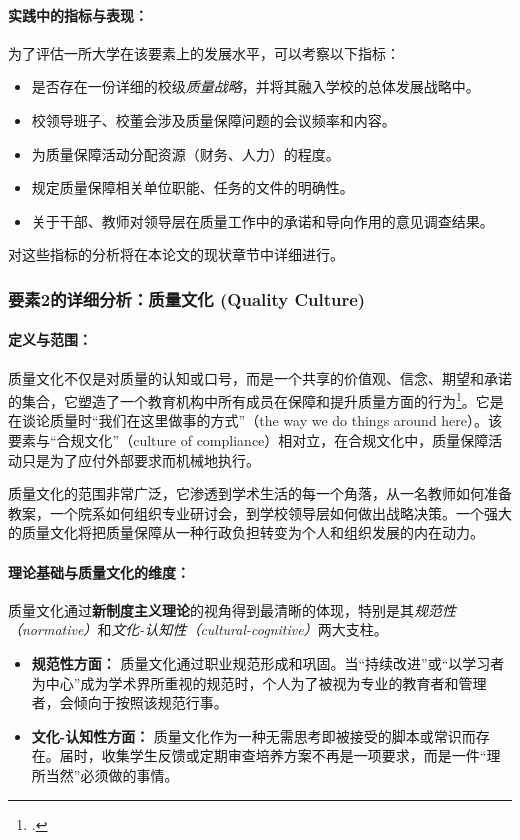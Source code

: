 \paragraph{实践中的指标与表现：}
为了评估一所大学在该要素上的发展水平，可以考察以下指标：
\begin{itemize}
    \item 是否存在一份详细的校级\textit{质量战略}，并将其融入学校的总体发展战略中。
    \item 校领导班子、校董会涉及质量保障问题的会议频率和内容。
    \item 为质量保障活动分配资源（财务、人力）的程度。
    \item 规定质量保障相关单位职能、任务的文件的明确性。
    \item 关于干部、教师对领导层在质量工作中的承诺和导向作用的意见调查结果。
\end{itemize}
对这些指标的分析将在本论文的现状章节中详细进行。




\subsubsection{要素2的详细分析：质量文化 (Quality Culture)}
\label{subsubsec:thanh_to_2}

\paragraph{定义与范围：}
质量文化不仅是对质量的认知或口号，而是一个共享的价值观、信念、期望和承诺的集合，它塑造了一个教育机构中所有成员在保障和提升质量方面的行为\footcite{HarveyStensaker}。它是在谈论质量时“我们在这里做事的方式”（the way we do things around here）。该要素与“合规文化”（culture of compliance）相对立，在合规文化中，质量保障活动只是为了应付外部要求而机械地执行。

质量文化的范围非常广泛，它渗透到学术生活的每一个角落，从一名教师如何准备教案，一个院系如何组织专业研讨会，到学校领导层如何做出战略决策。一个强大的质量文化将把质量保障从一种行政负担转变为个人和组织发展的内在动力。

\paragraph{理论基础与质量文化的维度：}
质量文化通过\textbf{新制度主义理论}的视角得到最清晰的体现，特别是其\textit{规范性（normative）}和\textit{文化-认知性（cultural-cognitive）}两大支柱。
\begin{itemize}
    \item \textbf{规范性方面：} 质量文化通过职业规范形成和巩固。当“持续改进”或“以学习者为中心”成为学术界所重视的规范时，个人为了被视为专业的教育者和管理者，会倾向于按照该规范行事。
    \item \textbf{文化-认知性方面：} 质量文化作为一种无需思考即被接受的脚本或常识而存在。届时，收集学生反馈或定期审查培养方案不再是一项要求，而是一件“理所当然”必须做的事情。
\end{itemize}

